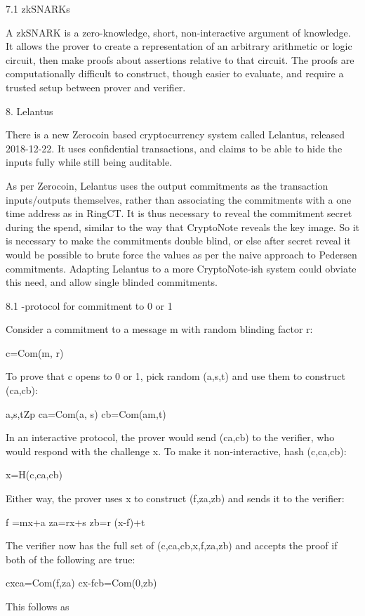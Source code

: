 \documentclass{article}
\begin{document}
7.1 zkSNARKs

A zkSNARK is a zero-knowledge, short, non-interactive argument of knowledge.  It allows the prover to create a representation of an arbitrary arithmetic or logic circuit, then make proofs about assertions relative to that circuit.  The proofs are computationally difficult to construct, though easier to evaluate, and require a trusted setup between prover and verifier.



8. Lelantus

There is a new Zerocoin based cryptocurrency system called Lelantus, released 2018-12-22.  It uses confidential transactions, and claims to be able to hide the inputs fully while still being auditable.  

As per Zerocoin, Lelantus uses the output commitments as the transaction inputs/outputs themselves, rather than associating the commitments with a one time address as in RingCT.  It is thus necessary to reveal the commitment secret during the spend, similar to the way that CryptoNote reveals the key image.  So it is necessary to make the commitments double blind, or else after secret reveal it would be possible to brute force the values as per the naive approach to Pedersen commitments.  Adapting Lelantus to a more CryptoNote-ish system could obviate this need, and allow single blinded commitments.


8.1 -protocol for commitment to 0 or 1

Consider a commitment to a message m with random blinding factor r:

	c=Com(m, r)

To prove that c opens to 0 or 1, pick random (a,s,t) and use them to construct (ca,cb):

	a,s,tZp
	ca=Com(a, s)
	cb=Com(am,t)

In an interactive protocol, the prover would send (ca,cb) to the verifier, who would respond with the challenge x.  To make it non-interactive, hash (c,ca,cb):

	x=H(c,ca,cb)

Either way, the prover uses x to construct (f,za,zb) and sends it to the verifier:
 
	f =mx+a
	za=rx+s
	zb=r (x-f)+t

The verifier now has the full set of (c,ca,cb,x,f,za,zb) and accepts the proof if both of the following are true:

	cxca=Com(f,za)
	cx-fcb=Com(0,zb)

This follows as 
\end{document}
